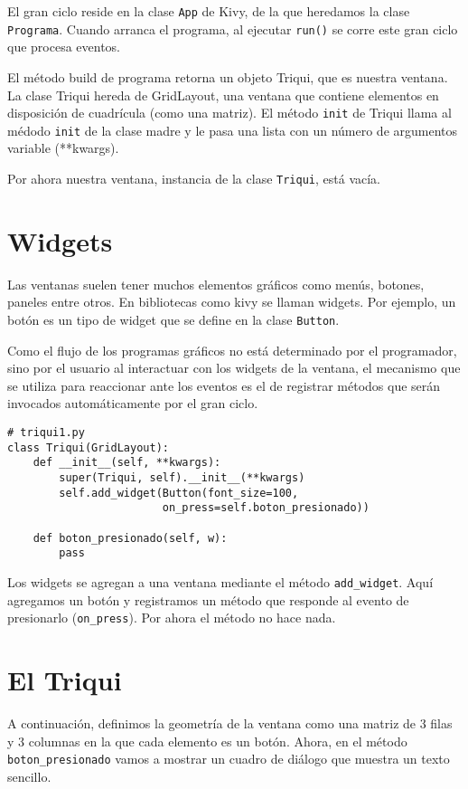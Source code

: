 El gran ciclo reside en la clase \texttt{App} de Kivy, de la que heredamos la clase
\texttt{Programa}. Cuando arranca el programa, al ejecutar \texttt{run()} se corre este
gran ciclo que procesa eventos.

El método build de programa retorna un objeto Triqui, que es nuestra ventana.
La clase Triqui hereda de GridLayout, una ventana que contiene elementos
en disposición de cuadrícula (como una matriz). El método \texttt{init} de Triqui
llama al médodo \texttt{init} de la clase madre y le pasa una lista con un número
de argumentos variable (**kwargs). 

Por ahora nuestra ventana, instancia de la clase \texttt{Triqui}, está vacía.

\section{Widgets}
Las ventanas suelen tener muchos elementos gráficos como menús, botones, paneles
entre otros. En bibliotecas como kivy se llaman widgets. Por 
ejemplo, un botón es un tipo de widget que  se define en la clase \texttt{Button}.

Como el flujo de los programas gráficos no está determinado por el programador,
sino por el usuario al interactuar con los widgets de la ventana, el mecanismo
que se utiliza para reaccionar ante los eventos es el de registrar métodos que 
serán invocados automáticamente por el gran ciclo.

\beforeverb
\begin{verbatim}
# triqui1.py
class Triqui(GridLayout):
    def __init__(self, **kwargs):
        super(Triqui, self).__init__(**kwargs)
        self.add_widget(Button(font_size=100, 
                        on_press=self.boton_presionado))
    
    def boton_presionado(self, w):
        pass

\end{verbatim}
\afterverb

Los widgets se agregan a una ventana mediante el método \texttt{add\_widget}. Aquí agregamos
un botón y registramos un método que responde al evento de presionarlo (\texttt{on\_press}). 
Por ahora el método no hace nada.

\section{El Triqui}

A continuación, definimos la geometría de la ventana como una matriz de 3 filas 
y 3 columnas en la que cada elemento es un botón. Ahora, en el método 
\texttt{boton\_presionado}
vamos a mostrar un cuadro de diálogo que muestra un texto sencillo.

